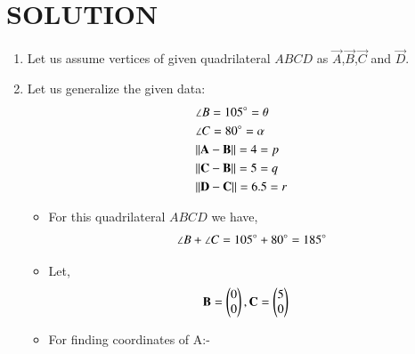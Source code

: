 \documentclass[journal,12pt,twocolumn]{IEEEtran}
\begin{document}
\section{SOLUTION}
\begin{enumerate}
\item Let us assume vertices of given quadrilateral $ABCD$ as $\vec{A}$,$\vec{B}$,$\vec{C}$ and $\vec{D}$.
\item Let us generalize the given data:
    \begin{align}
    &\angle B= 105\degree=\theta \label{eq1}
    \\
    &\angle C= 80\degree=\alpha \label{eq2}
    \\
    &\Vert\mathbf{A}-\mathbf{B}\rVert =4=p \label{eq3}
    \\
    &\Vert\mathbf{C}-\mathbf{B}\rVert =5=q \label{eq4}
    \\
     &\Vert\mathbf{D}-\mathbf{C}\rVert =6.5=r \label{eq5}
    \end{align}
\begin{itemize}
\item For this quadrilateral $ABCD$ we have,
\begin{align}
\angle B +\angle C = 105\degree + 80\degree =185\degree
\end{align}
\item Let, \begin{align}
    &\mathbf{B}=\begin{pmatrix}0\\0\end{pmatrix}, \mathbf{C}=\begin{pmatrix}5\\0\end{pmatrix}
\end{align}
\end{itemize}
\begin{itemize}
\item For finding coordinates of A:-

\end{itemize}
\end{enumerate}
\end{document}
